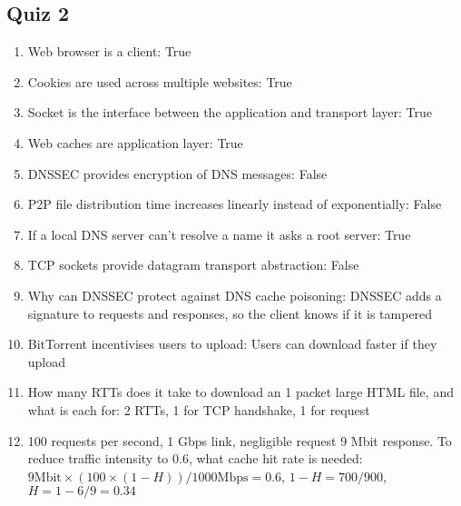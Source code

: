 \subsection{Quiz 2}
\begin{enumerate}
	\itemsep-0.5em
	\item Web browser is a client: True
	\item Cookies are used across multiple websites: True
	\item Socket is the interface between the application and transport layer: True
	\item Web caches are application layer: True
	\item DNSSEC provides encryption of DNS messages: False
	\item P2P file distribution time increases linearly instead of exponentially: False
	\item If a local DNS server can't resolve a name it asks a root server: True
	\item TCP sockets provide datagram transport abstraction: False
	\item Why can DNSSEC protect against DNS cache poisoning: DNSSEC adds a signature to requests and responses, so the client knows if it is tampered
	\item BitTorrent incentivises users to upload: Users can download faster if they upload
	\item How many RTTs does it take to download an 1 packet large HTML file, and what is each for: 2 RTTs, 1 for TCP handshake, 1 for request
	\item 100 requests per second, 1 Gbps link, negligible request 9 Mbit response. To reduce traffic intensity to 0.6, what cache hit rate is needed: $9\text{Mbit}\times(100\times(1-H))/1000\text{Mbps}=0.6$, $1-H=700/900$, $H=1-6/9=0.34$
\end{enumerate}


